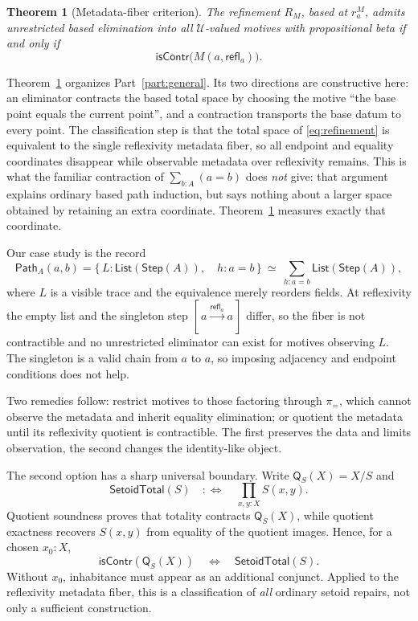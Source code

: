 \documentclass[10pt,reqno]{amsart}
\newtheorem{theorem}{Theorem}[section]
\newcommand{\U}{\mathcal U}
\newcommand{\isContr}{\mathsf{isContr}}
\newcommand{\Eqv}{\simeq}
\newcommand{\Step}{\mathsf{Step}}
\newcommand{\PathTy}{\mathsf{Path}}
\newcommand{\refl}{\mathsf{refl}}
\newcommand{\List}{\mathsf{List}}
\newcommand{\proj}{\pi_{=}}
\newcommand{\SetTot}{\mathsf{SetoidTotal}}
\newcommand{\Q}{\mathsf Q}
\begin{document}
\begin{theorem}[Metadata-fiber criterion]
\label{thm:headline}
The refinement \(R_M\), based at \(r^M_a\), admits unrestricted based
elimination into all \(\U\)-valued motives with propositional beta if and only
if
\[
                        \isContr\bigl(M(a,\refl_a)\bigr).
\tag{1.3}\label{eq:headline}
\]
\end{theorem}

Theorem~\ref{thm:headline} organizes Part~\ref{part:general}.  Its two
directions are constructive here: an eliminator contracts the based total space
by choosing the motive ``the base point equals the current point'', and a
contraction transports the base datum to every point.  The classification step
is that the total space of \eqref{eq:refinement} is equivalent to the single
reflexivity metadata fiber, so all endpoint and equality coordinates disappear
while observable metadata over reflexivity remains.  This is what the familiar
contraction of \(\sum_{b:A}(a=b)\) does \emph{not} give: that argument explains
ordinary based path induction, but says nothing about a larger space obtained by
retaining an extra coordinate.  Theorem~\ref{thm:headline} measures exactly that
coordinate.

Our case study is the record
\[
 \PathTy_A(a,b)
   =\bigl\{\,L:\List(\Step(A)),\quad h:a=b\,\bigr\}
 \ \Eqv\ \sum_{h:a=b}\List(\Step(A)),
\tag{1.4}\label{eq:path-record}
\]
where \(L\) is a visible trace and the equivalence merely reorders fields.  At
reflexivity the empty list and the singleton step
\([\,a\xrightarrow{\refl_a}a\,]\) differ, so the fiber is not contractible and
no unrestricted eliminator can exist for motives observing \(L\).  The singleton
is a valid chain from \(a\) to \(a\), so imposing adjacency and endpoint
conditions does not help.

Two remedies follow: restrict motives to those factoring through \(\proj\),
which cannot observe the metadata and inherit equality elimination; or quotient
the metadata until its reflexivity quotient is contractible.  The first
preserves the data and limits observation, the second changes the identity-like
object.

The second option has a sharp universal boundary.  Write
\(\Q_S(X)=X/S\) and
\[
 \SetTot(S)\quad:\!\!\Longleftrightarrow\quad
 \prod_{x,y:X}S(x,y).
\tag{1.5}\label{eq:setoid-total-intro}
\]
Quotient soundness proves that totality contracts \(\Q_S(X)\), while quotient
exactness recovers \(S(x,y)\) from equality of the quotient images.  Hence, for
a chosen \(x_0:X\),
\[
 \isContr(\Q_S(X))\quad\Longleftrightarrow\quad\SetTot(S).
\tag{1.6}\label{eq:quotient-intro}
\]
Without \(x_0\), inhabitance must appear as an additional conjunct.  Applied to
the reflexivity metadata fiber, this is a classification of \emph{all} ordinary
setoid repairs, not only a sufficient construction.
\end{document}

